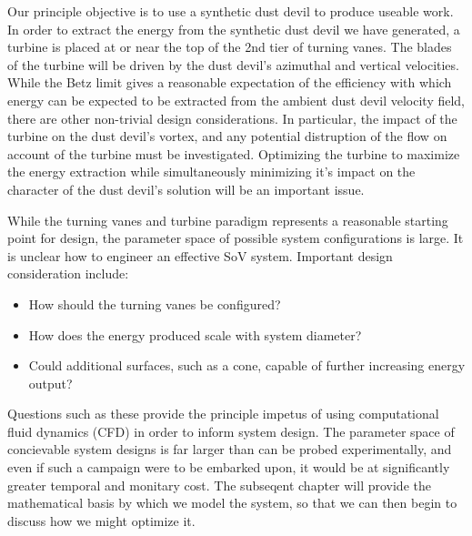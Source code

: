 
Our principle objective is to use a synthetic dust devil to produce 
useable work. In order to extract the energy from the synthetic dust
devil we have generated, a turbine is placed 
at or near the top of the 2nd tier of turning vanes. 
The blades of the turbine will be driven by the dust devil's azimuthal
and vertical velocities. While the Betz limit gives a reasonable
expectation of the efficiency with which energy can be expected to be
extracted from the ambient dust devil velocity field, there are other
non-trivial design considerations. In particular, the impact of the
turbine on the dust devil's vortex, and any potential distruption of the
flow on account of the turbine must be investigated. Optimizing the
turbine to maximize the energy extraction while simultaneously
minimizing it's impact on the character of the dust devil's solution
will be an important issue.

While the turning vanes and turbine  
paradigm represents a reasonable starting point for design, the
parameter space of possible system configurations is large. It is
unclear how to engineer an effective SoV system. Important design
consideration include: 
\begin{itemize}
  \item How should the turning vanes be configured?
  \item How does the energy produced scale with system diameter?
  \item Could additional surfaces, such as a cone, capable of further 
    increasing energy output?
\end{itemize}

Questions such as these provide the principle impetus of using
computational fluid dynamics (CFD) in order to inform system design. The
parameter space of concievable system designs is far larger than can be
probed experimentally, and even if such a campaign were to be embarked
upon, it would be at significantly greater temporal and monitary
cost. The subseqent chapter will provide the mathematical basis by which
we model the system, so that we can then begin to discuss how we might
optimize it.  


